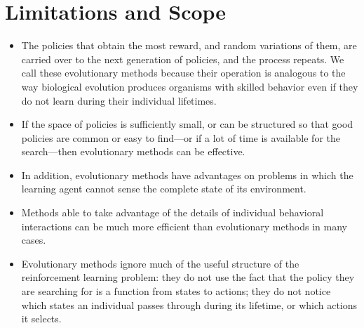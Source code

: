\documentclass{article}
\begin{document}
\section{Limitations and Scope}
\begin{itemize}
    \item The policies that obtain the most reward, and random variations of them, are carried over to the next generation of policies, and the process repeats. We call these evolutionary methods because their operation is analogous to the way biological evolution produces organisms with skilled behavior even if they do not learn during their individual lifetimes. 
    \item If the space of policies is sufficiently small, or can be structured so that good policies are common or easy to find—or if a lot of time is available for the search—then evolutionary methods can be effective.
    \item In addition, evolutionary methods have advantages on problems in which the learning agent cannot sense the complete state of its environment.
    \item Methods able to take advantage of the details of individual behavioral interactions can be much more efficient than evolutionary methods in many cases. 
    \item Evolutionary methods ignore much of the useful structure of the reinforcement learning problem: they do not use the fact that the policy they are searching for is a function from states to actions; they do not notice which states an individual passes through during its lifetime, or which actions it selects.
\end{itemize}
\end{document}

